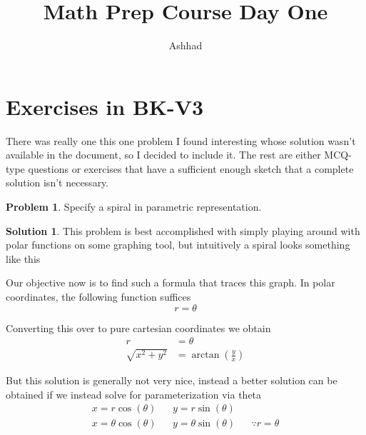 \documentclass[a4paper]{article}
\title{Math Prep Course Day One}
\author{Ashhad}
\theoremstyle{definition}
\newtheorem{problem}{Problem}[section]
\newtheorem*{solution}{Solution}
\begin{document}
\maketitle

\section{Exercises in BK-V3}
There was really one this one problem I found interesting whose solution wasn't available in the document, so I decided to include it. The rest are either MCQ-type questions or exercises that have a sufficient enough sketch that a complete solution isn't necessary.

\begin{problem}
Specify a spiral in parametric representation.
\end{problem}
\begin{solution}
This problem is best accomplished with simply playing around with polar functions on some graphing tool, but intuitively a spiral looks something like this


Our objective now is to find such a formula that traces this graph. In polar coordinates, the following function suffices
\[
r = \theta
\]

Converting this over to pure cartesian coordinates we obtain
\begin{align*}
r &= \theta \\
\sqrt{x^2 +y^2} &= \arctan(\frac{y}{x})
\end{align*}
\end{solution}

But this solution is generally not very nice, instead a better solution can be obtained if we instead solve for parameterization via theta
\begin{align*}
x = r\cos(\theta) && y = r\sin(\theta) \\
x = \theta\cos(\theta) && y = \theta\sin(\theta) && \because r = \theta
\end{align*}
\end{document}
